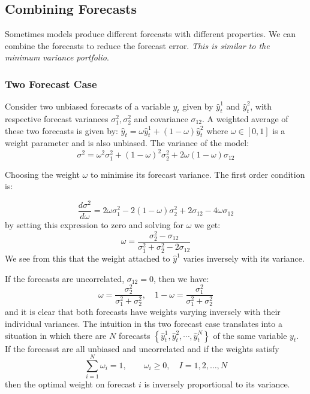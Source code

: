 \documentclass[11pt]{article}
\begin{document}
\subsection{Combining Forecasts}
Sometimes models produce different forecasts with different properties. We can combine the forecasts to reduce the forecast error. \textit{This is similar to the minimum variance portfolio}.

\subsubsection{Two Forecast Case}

Consider two unbiased forecasts of a variable $y_t$ given by $\widehat{y}_t^1$ and $\widehat{y}_t^2$, with respective forecast variances $\sigma^2_1, \sigma_2^2$ and covariance $\sigma_{12}$. A weighted average of these two forecasts is given by:
$\widehat{y}_t=\omega \widehat{y}_t^1+(1-\omega) \widehat{y}_t^2$
where $\omega \in [0,1]$ is a weight parameter and is also unbiased. 
The variance of the model:
\begin{equation}
    \sigma^2=\omega^2 \sigma_1^2+(1-\omega)^2 \sigma_2^2+2 \omega(1-\omega) \sigma_{12}
\end{equation}

Choosing the weight $\omega$ to minimise its forecast variance. The first order condition is:

\begin{equation}
\frac{d \sigma^2}{d \omega}=2 \omega \sigma_1^2-2(1-\omega) \sigma_2^2+2 \sigma_{12}-4 \omega \sigma_{12}
\end{equation}
by setting this expression to zero and solving for $\omega$ we get:
\begin{equation}
\omega=\frac{\sigma_2^2-\sigma_{12}}{\sigma_1^2+\sigma_2^2-2 \sigma_{12}}
\end{equation}
We see from this that the weight attached to $\hat{y}^1$ varies inversely with its variance.

\begin{note}
    If the forecasts are uncorrelated, $\sigma_{12} = 0$, then we have:
    \begin{equation}
\omega=\frac{\sigma_2^2}{\sigma_1^2+\sigma_2^2}, \quad 1-\omega=\frac{\sigma_1^2}{\sigma_1^2+\sigma_2^2}
\end{equation}
and it is clear that both forecasts have weights varying inversely with their individual variances. The intuition in ths two forecast case translates into a situation in which there are $N$ forecasts $\left\{\widehat{y}_t^1, \widehat{y}_t^2, \cdots, \widehat{y}_t^N\right\}$ of the same variable $y_t$. If the forecasst are all unbiased and uncorrelated and if the weights satisfy
\[\sum_{i=1}^N \omega_i = 1, \qquad \omega_i\geq0, \quad I=1,2,\ldots, N\]
then the optimal weight on forecast $i$ is inversely proportional to its variance.
\end{note}
\end{document}

